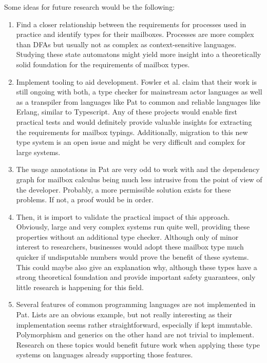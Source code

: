 Some ideas for future research would be the following:
\begin{enumerate}
    \item Find a closer relationship between the requirements for processes used in practice and identify types for their mailboxes. Processes are more complex than DFAs but usually not as complex as context-sensitive languages. Studying these state automatons might yield more insight into a theoretically solid foundation for the requirements of mailbox types.
    \item Implement tooling to aid development. Fowler et al.\cite{fowlerSpecialDeliveryProgramming2023} claim that their work is still ongoing with both, a type checker for mainstream actor languages as well as a transpiler from languages like Pat to common and reliable languages like Erlang, similar to Typescript. Any of these projects would enable first practical tests and would definitely provide valuable insights for extracting the requirements for mailbox typings. Additionally, migration to this new type system is an open issue and might be very difficult and complex for large systems.
    \item The usage annotations in Pat are very odd to work with and the dependency graph for mailbox calculus being much less intrusive from the point of view of the developer. Probably, a more permissible solution exists for these problems. If not, a proof would be in order.
    \item Then, it is import to validate the practical impact of this approach. Obviously, large and very complex systems run quite well, providing these properties without an additional type checker. Although only of minor interest to researchers, businesses would adopt these mailbox type much quicker if undisputable numbers would prove the benefit of these systems. This could maybe also give an explanation why, although these types have a strong theoretical foundation and provide important safety guarantees, only little research is happening for this field.
    \item Several features of common programming languages are not implemented in Pat. Lists are an obvious example, but not really interesting as their implementation seems rather straightforward, especially if kept immutable. Polymorphism and generics on the other hand are not trivial to implement. Research on these topics would benefit future work when applying these type systems on languages already supporting those features.
\end{enumerate}



